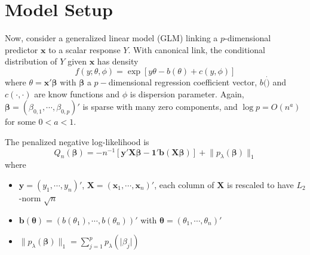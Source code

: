 \documentclass[twoside]{article}
\begin{document}

\section{Model Setup}
Now, consider a generalized linear model (GLM) linking a $p$-dimensional predictor $\mathbf{x}$ to a scalar response $Y$. With canonical link, the conditional distribution of $Y$ given $\mathbf{x}$ has density
$$
f(y;\theta,\phi) = \exp\left[ y\theta-b(\theta)+c(y,\phi) \right]
$$
where $\theta = \mathbf{x}'\boldsymbol{\beta}$ with $\boldsymbol{\beta}$ a $p-$dimensional regression coefficient vector, $b(\dot)$ and $c(\cdot,\cdot)$ are know functions and $\phi$ is dispersion parameter. Again, $\boldsymbol{\beta}=\left( \beta_{0,1},\cdots,\beta_{0,p} \right)'$ is sparse with many zero components, and $\log p = O(n^a)$ for some $0<a<1$.

The penalized negative log-likelihood is
$$
Q_n(\boldsymbol{\beta}) = -n^{-1}\left[ \mathbf{y}'\mathbf{X}\boldsymbol{\beta} - \mathbf{1}'\mathbf{b}(\mathbf{X}\boldsymbol{\beta}) \right] + \lVert p_{\lambda}(\boldsymbol{\beta}) \rVert _1
$$
where
\begin{itemize}
    \item $\mathbf{y}=\left( y_1,\cdots,y_n \right)'$, $\mathbf{X}=\left(\mathbf{x}_1,\cdots,\mathbf{x}_n\right)'$, each column of $\mathbf{X}$ is rescaled to have $L_2$-norm $\sqrt{n}$
    \item $\mathbf{b}(\boldsymbol{\theta}) = \left( b(\theta_1),\cdots,b(\theta_n) \right)'$ with $\boldsymbol{\theta} = \left(\theta_1,\cdots,\theta_n\right)'$
    \item $\lVert p_{\lambda}(\boldsymbol{\beta}) \rVert _1 = \sum^p_{j=1}p_{\lambda}(\lvert \beta_j \rvert)$
\end{itemize}
\end{document}
